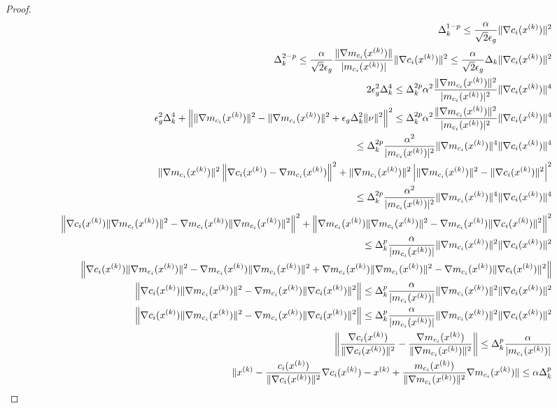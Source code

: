 \begin{proof}
\begin{align*}
\Delta_k^{1 - p} \le \frac{\alpha}{\sqrt{2}\epsilon_{g}}\|\nabla c_i({x^{(k)}})\|^2\\
\Delta_k^{2-p} \le \frac{\alpha}{\sqrt{2}\epsilon_{g}}\frac{\|\nabla m_{c_i}({x^{(k)}})\|}{|m_{c_i}({x^{(k)}})|}\|\nabla c_i({x^{(k)}})\|^2 
\le \frac{\alpha}{\sqrt{2}\epsilon_{g}}\Delta_k\|\nabla c_i({x^{(k)}})\|^2\\
2\epsilon_{g}^2\Delta_k^4
\le \Delta_k^{2p} \alpha^2\frac{\|\nabla m_{c_i}({x^{(k)}})\|^2}{|m_{c_i}({x^{(k)}})|^2}\|\nabla c_i({x^{(k)}})\|^4\\
\epsilon_{g}^2\Delta_k^4
+\left\|\|\nabla m_{c_i}({x^{(k)}})\|^2 - \|\nabla m_{c_i}({x^{(k)}})\|^2 + \epsilon_{g}\Delta_k^2\|\nu \|^2 \right\|^2
\le \Delta_k^{2p} \alpha^2\frac{\|\nabla m_{c_i}({x^{(k)}})\|^2}{|m_{c_i}({x^{(k)}})|^2}\|\nabla c_i({x^{(k)}})\|^4\\
\le \Delta_k^{2p} \frac{\alpha^2}{|m_{c_i}({x^{(k)}})|^2}\|\nabla m_{c_i}({x^{(k)}})\|^4\|\nabla c_i({x^{(k)}})\|^4\\
\|\nabla m_{c_i}({x^{(k)}})\|^2\left\|\nabla c_i({x^{(k)}}) - \nabla m_{c_i}({x^{(k)}})\right\|^2
+\|\nabla m_{c_i}({x^{(k)}})\|^2\left|\|\nabla m_{c_i}({x^{(k)}})\|^2 - \|\nabla c_i({x^{(k)}})\|^2
\right|^2\\
\le \Delta_k^{2p} \frac{\alpha^2}{|m_{c_i}({x^{(k)}})|^2}\|\nabla m_{c_i}({x^{(k)}})\|^4\|\nabla c_i({x^{(k)}})\|^4\\
\left\|\nabla c_i({x^{(k)}})\|\nabla m_{c_i}({x^{(k)}})\|^2 - \nabla m_{c_i}({x^{(k)}})\|\nabla m_{c_i}({x^{(k)}})\|^2\right\|^2
+\left\|\nabla m_{c_i}({x^{(k)}})\|\nabla m_{c_i}({x^{(k)}})\|^2 - \nabla m_{c_i}({x^{(k)}})\|\nabla c_i({x^{(k)}})\|^2
\right\|^2\\
\le \Delta_k^p \frac{\alpha}{|m_{c_i}({x^{(k)}})|}\|\nabla m_{c_i}({x^{(k)}})\|^2\|\nabla c_i({x^{(k)}})\|^2\\
\left\|\nabla c_i({x^{(k)}})\|\nabla m_{c_i}({x^{(k)}})\|^2 - \nabla m_{c_i}({x^{(k)}})\|\nabla m_{c_i}({x^{(k)}})\|^2
+\nabla m_{c_i}({x^{(k)}})\|\nabla m_{c_i}({x^{(k)}})\|^2 - \nabla m_{c_i}({x^{(k)}})\|\nabla c_i({x^{(k)}})\|^2
\right\|\\
\left\|\nabla c_i({x^{(k)}})\|\nabla m_{c_i}({x^{(k)}})\|^2 -
\nabla m_{c_i}({x^{(k)}})\|\nabla c_i({x^{(k)}})\|^2
\right\| \le \Delta_k^p \frac{\alpha}{|m_{c_i}({x^{(k)}})|}\|\nabla m_{c_i}({x^{(k)}})\|^2\|\nabla c_i({x^{(k)}})\|^2\\
\left\|\nabla c_i({x^{(k)}})\|\nabla m_{c_i}({x^{(k)}})\|^2 -
\nabla m_{c_i}({x^{(k)}})\|\nabla c_i({x^{(k)}})\|^2
\right\| \le \Delta_k^p \frac{\alpha}{|m_{c_i}({x^{(k)}})|}\|\nabla m_{c_i}({x^{(k)}})\|^2\|\nabla c_i({x^{(k)}})\|^2\\
\left\|\frac{\nabla c_i({x^{(k)}})}{\|\nabla c_i({x^{(k)}})\|^2} -
\frac{\nabla m_{c_i}({x^{(k)}})}{\|\nabla m_{c_i}({x^{(k)}})\|^2}
\right\| \le \Delta_k^p \frac{\alpha}{|m_{c_i}({x^{(k)}})|}\\
\|
{x^{(k)}} - \frac{c_i({x^{(k)}})}{\|\nabla c_i({x^{(k)}})\|^2}\nabla c_i({x^{(k)}}) -
{x^{(k)}} + \frac{m_{c_i}({x^{(k)}})}{\|\nabla m_{c_i}({x^{(k)}})\|^2}\nabla m_{c_i}({x^{(k)}})
\| \le \alpha \Delta_k^p \\
\end{align*}




\end{proof}
